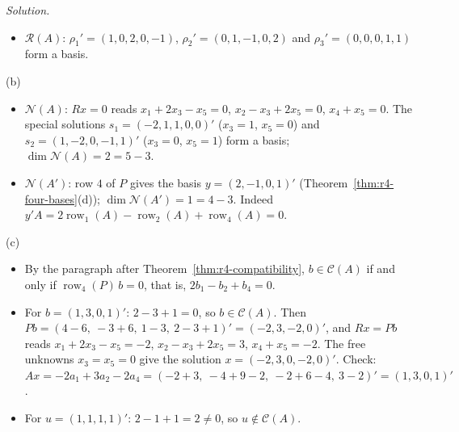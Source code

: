 \documentclass[12pt]{article}
\DeclareMathOperator{\row}{row}
\theoremstyle{definition}
\newenvironment{solution}{\par\noindent\textit{Solution.}\ }{\par\smallskip}
\begin{document}
\begin{solution}
\begin{itemize}
\item \(\mathcal R(A)\): \(\rho_1'=(1,0,2,0,-1)\), \(\rho_2'=(0,1,-1,0,2)\) and \(\rho_3'=(0,0,0,1,1)\) form a basis.
\end{itemize}
(b)
\begin{itemize}
\item \(\mathcal N(A)\): \(Rx=0\) reads \(x_1+2x_3-x_5=0\), \(x_2-x_3+2x_5=0\), \(x_4+x_5=0\). The special solutions
\(s_1=(-2,1,1,0,0)'\) (\(x_3=1\), \(x_5=0\)) and \(s_2=(1,-2,0,-1,1)'\) (\(x_3=0\), \(x_5=1\)) form a basis;
\(\dim\mathcal N(A)=2=5-3\).
\item \(\mathcal N(A')\): row \(4\) of \(P\) gives the basis \(y=(2,-1,0,1)'\) (Theorem~\ref{thm:r4-four-bases}(d));
\(\dim\mathcal N(A')=1=4-3\). Indeed \(y'A=2\row_1(A)-\row_2(A)+\row_4(A)=0\).
\end{itemize}
(c)
\begin{itemize}
\item By the paragraph after Theorem~\ref{thm:r4-compatibility}, \(b\in\mathcal C(A)\) if and only if
\(\row_4(P)\,b=0\), that is, \(2b_1-b_2+b_4=0\).
\item For \(b=(1,3,0,1)'\): \(2-3+1=0\), so \(b\in\mathcal C(A)\). Then \(Pb=(4-6,\ -3+6,\ 1-3,\ 2-3+1)'=(-2,3,-2,0)'\),
and \(Rx=Pb\) reads \(x_1+2x_3-x_5=-2\), \(x_2-x_3+2x_5=3\), \(x_4+x_5=-2\). The free unknowns \(x_3=x_5=0\) give the
solution \(x=(-2,3,0,-2,0)'\). Check: \(Ax=-2a_1+3a_2-2a_4=(-2+3,\ -4+9-2,\ -2+6-4,\ 3-2)'=(1,3,0,1)'\).
\item For \(u=(1,1,1,1)'\): \(2-1+1=2\ne0\), so \(u\notin\mathcal C(A)\).
\end{itemize}
\end{solution}
\end{document}
